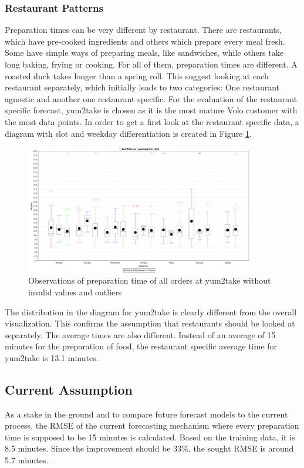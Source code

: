 \subsubsection{Restaurant Patterns}\label{subsection:Restaurant Wise Proceeding}
Preparation times can be very different by restaurant. There are restaurants, which have pre-cooked ingredients and others which prepare every meal fresh. Some have simple ways of preparing meals, like sandwiches, while others take long baking, frying or cooking. For all of them, preparation times are different. A roasted duck takes longer than a spring roll.\newline
This suggest looking at each restaurant separately, which initially leads to two categories: One restaurant agnostic and another one restaurant specific. For the evaluation of the restaurant specific forecast, yum2take is chosen as it is the most mature Volo customer with the most data points.\newline
In order to get a first look at the restaurant specific data, a diagram with slot and weekday differentiation is created in Figure \ref{fig:1_boxWhisker_weekdaySlot_686}.
\begin{figure}[h]
\begin{center}
\includegraphics[width=10cm]{images/1_boxWhisker_weekdaySlot_686.png}
\caption{Observations of preparation time of all orders at yum2take without invalid values and outliers}
\label{fig:1_boxWhisker_weekdaySlot_686}
\end{center}
\end{figure}
The distribution in the diagram for yum2take is clearly different from the overall visualization. This confirms the assumption that restaurants should be looked at separately. The average times are also different. Instead of an average of 15 minutes for the preparation of food, the restaurant specific average time for yum2take is 13.1 minutes.
\subsection{Current Assumption}
As a stake in the ground and to compare future forecast models to the current process, the RMSE of the current forecasting mechanism where every preparation time is supposed to be 15 minutes is calculated. Based on the training data, it is 8.5 minutes. Since the improvement should be 33\%, the sought RMSE is around 5.7 minutes.
